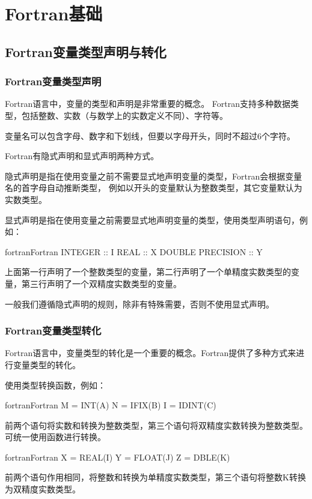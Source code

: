 \newpage
\section{Fortran基础}
\subsection{Fortran变量类型声明与转化}
\subsubsection{Fortran变量类型声明}
Fortran语言中，变量的类型和声明是非常重要的概念。
Fortran支持多种数据类型，包括整数、实数（与数学上的实数定义不同）、字符等。

变量名可以包含字母、数字和下划线，但要以字母开头，同时不超过6个字符。

Fortran有隐式声明和显式声明两种方式。

隐式声明是指在使用变量之前不需要显式地声明变量的类型，Fortran会根据变量名的首字母自动推断类型，
例如以开头的变量默认为整数类型，其它变量默认为实数类型。

显式声明是指在使用变量之前需要显式地声明变量的类型，使用类型声明语句，例如：
\begin{envcode}{fortran}{Fortran}
      INTEGER :: I
      REAL :: X
      DOUBLE PRECISION :: Y
\end{envcode}
上面第一行声明了一个整数类型的变量，第二行声明了一个单精度实数类型的变量，第三行声明了一个双精度实数类型的变量。

一般我们遵循隐式声明的规则，除非有特殊需要，否则不使用显式声明。

\subsubsection{Fortran变量类型转化}
Fortran语言中，变量类型的转化是一个重要的概念。Fortran提供了多种方式来进行变量类型的转化。

使用类型转换函数，例如：
\begin{envcode}{fortran}{Fortran}
      M = INT(A)
      N = IFIX(B)
      I = IDINT(C)
\end{envcode}
前两个语句将实数和转换为整数类型，第三个语句将双精度实数转换为整数类型。可统一使用函数进行转换。

\begin{envcode}{fortran}{Fortran}
      X = REAL(I)
      Y = FLOAT(J)
      Z = DBLE(K)
\end{envcode}
前两个语句作用相同，将整数和转换为单精度实数类型，第三个语句将整数K转换为双精度实数类型。

